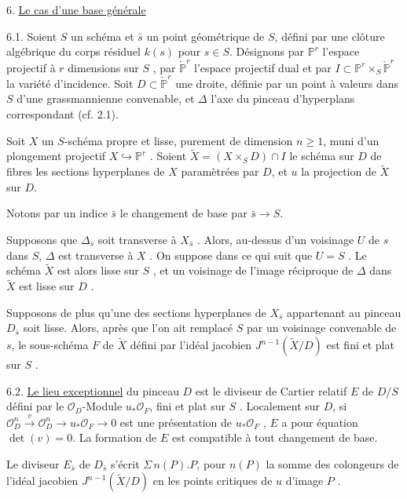 

6. \underline{Le cas d'une base générale}

6.1. Soient $S$ un schéma et $\bar{s}$ un point géométrique de $S$, défini par une clôture algébrique du corps résiduel $k(s)$ pour $s \in S$. Désignons par $\mathbb{P}^r$ l'espace projectif à $r$ dimensions sur $S$ , par $\check{\mathbb{P}}^r$ l'espace projectif dual et par $I \subset \mathbb{P}^r \times_S \check{\mathbb{P}}^r$ la variété d'incidence. Soit $D \subset \check{\mathbb{P}}^r$ une droite, définie par un point à valeurs dans $S$ d'une grassmannienne convenable, et $\Delta$ l'axe du pinceau d'hyperplans correspondant (cf. 2.1).

Soit $X$ un $S$-schéma propre et lisse, purement de dimension $n \geq 1$, muni d'un plongement projectif $X \hookrightarrow \mathbb{P}^r$ . Soient $\widetilde{X} = (X \times_S D) \cap I$ le schéma sur $D$ de fibres les sections hyperplanes de $X$ paramètrées par $D$, et $u$ la projection de $\widetilde{X}$ sur $D$.

Notons par un indice $\bar{s}$ le changement de base par $\bar{s} \longrightarrow S$.

Supposons que $\Delta_{\bar{s}}$ soit transverse à $X_{\bar{s}}$ . Alors, au-dessus d'un voisinage $U$ de $s$ dans $S$, $\Delta$ est transverse à $X$ . On suppose dans ce qui suit que $U = S$ . Le schéma $\widetilde{X}$ est alors lisse sur $S$ , et un voisinage de l'image réciproque de $\Delta$ dans $\widetilde{X}$ est lisse sur $D$ .

Supposons de plus qu'une des sections hyperplanes de $X_{\bar{s}}$ appartenant au pinceau $D_{\bar{s}}$ soit lisse. Alors, après que l'on ait remplacé $S$ par un voisinage convenable de $s$, le sous-schéma $F$ de $\widetilde{X}$ défini par l'idéal jacobien $J^{n-1}(\widetilde{X}/D)$ est fini et plat sur $S$ .



6.2. \underline{Le lieu exceptionnel} du pinceau $D$ est le diviseur de Cartier relatif $E$ de $D/S$ défini par le $\mathcal{O}_D$-Module $u_*\mathcal{O}_F$, fini et plat sur $S$ . Localement sur $D$, si $\mathcal{O}_D^n \xrightarrow{\ v\ } \mathcal{O}_D^n \longrightarrow u_*\mathcal{O}_F \longrightarrow 0$ est une présentation de $u_*\mathcal{O}_F$ , $E$ a pour équation $\det(v) = 0$. La formation de $E$ est compatible à tout changement de base.

Le diviseur $E_{\bar{s}}$ de $D_{\bar{s}}$ s'écrit $\Sigma\, n(P).P$, pour $n(P)$ la somme des colongeurs de l'idéal jacobien $J^{n-1}(\widetilde{X}/D)$ en les points critiques de $u$ d'image $P$ .

